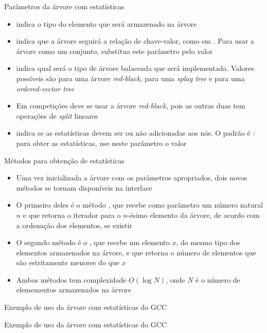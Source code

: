 \begin{frame}[fragile]{Parâmetros da árvore com estatísticas}

    \begin{itemize}
        \item {} indica o tipo do elemento que será armazenado na árvore

        \item {} indica que a árvore seguirá a relação de chave-valor, como
            em . Para usar a árvore como um conjunto, substitua este parâmetro pelo
            valor 

        \item {} indica qual será o tipo de árvore balaceada que será implementada.
            Valores possíveis são  para uma árvore \textit{red-black},
             para uma \textit{splay tree} e  para
            uma \textit{ordered-vector tree}

        \item Em competições deve se usar a árvore \textit{red-black}, pois as outras duas tem operações
            de \textit{split} lineares

        \item {} indica se as estatísticas devem ser ou não adicionadas aos nós. O padrão é : para obter as estatísticas, use neste parâmetro o valor 
    \end{itemize}
\end{frame}

\begin{frame}[fragile]{Métodos para obtenção de estatísticas}

    \begin{itemize}
        \item Uma vez inicializada a árvore com os parâmetros apropriados, dois novos métodos se
            tornam disponíveis na interface

        \item O primeiro deles é o método , que recebe como parâmetro um
            número natural $n$ e que retorna o iterador para o $n$-ésimo elemento da árvore, de acordo
            com a ordenação dos elementos, se existir

        \item O segundo método é o , que recebe um elemento $x$, do mesmo tipo
            dos elementos armazenados na árvore, e que retorna o número de elementos que são estritamente
            menores do que $x$

        \item Ambos métodos tem complexidade $O(\log N)$, onde $N$ é o número de elemementos armazenados
            na árvore
    \end{itemize}
\end{frame}

\begin{frame}[fragile]{Exemplo de uso da árvore com estatísticas do GCC}
\end{frame}

\begin{frame}[fragile]{Exemplo de uso da árvore com estatísticas do GCC}
\end{frame}
